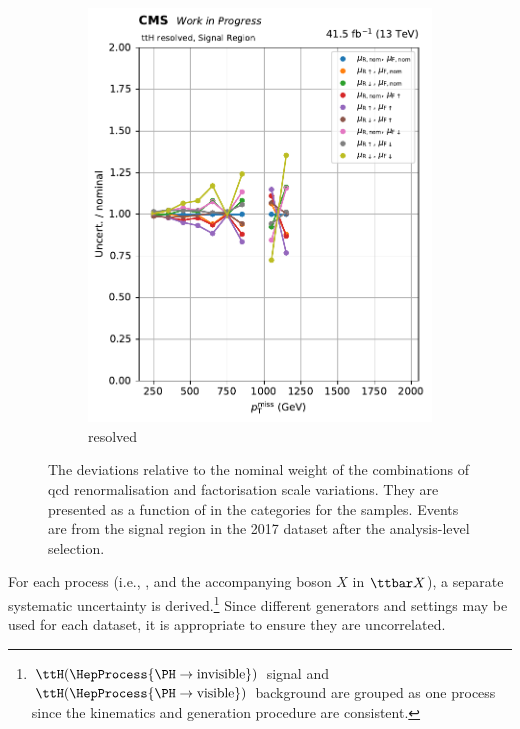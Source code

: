 \begin{figure}[htbp]
\begin{subfigure}[b]{0.34\textwidth}
        \includegraphics[width=\textwidth]{figures/qcd_scale_top_procs/ttbar/ratio_vars_SR_ttH_resolved.pdf}
        \caption{\ttH resolved}
    \end{subfigure}
    \caption[The deviations relative to the nominal weight of the combinations of QCD renormalisation and factorisation scale variations. They are presented as a function of \ptmiss in the \ttH categories for the \ttbar samples]{The deviations relative to the nominal weight of the combinations of \acrshort{qcd} renormalisation and factorisation scale variations. They are presented as a function of \ptmiss in the \ttH categories for the \ttbar samples. Events are from the signal region in the 2017 dataset after the analysis-level selection.}
    \label{fig:htoinv_ttbar_scale}
\end{figure}


For each process (i.e., \ttbar, and the accompanying boson $X$ in $\ttbar X$), a separate systematic uncertainty is derived.\footnote{$\ttH(\HepProcess{\PH \to \text{invisible}})$ signal and $\ttH(\HepProcess{\PH \to \text{visible}})$ background are grouped as one process since the kinematics and generation procedure are consistent.} Since different generators and settings may be used for each dataset, it is appropriate to ensure they are uncorrelated.


